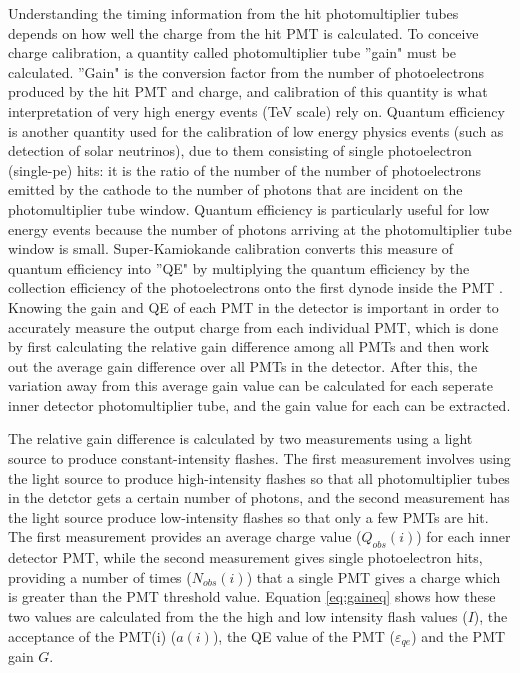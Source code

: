 Understanding the timing information from the hit photomultiplier tubes depends on how well the charge from the hit PMT is calculated. To conceive charge calibration, a quantity called photomultiplier tube ''gain" must be calculated. ''Gain" is the conversion factor from the number of photoelectrons produced by the hit PMT and charge, and calibration of this quantity is what interpretation of very high energy events (TeV scale) rely on. Quantum efficiency is another quantity used for the calibration of low energy physics events (such as detection of solar neutrinos), due to them consisting of single photoelectron (single-pe) hits: it is the ratio of the number of the number of photoelectrons emitted by the cathode to the number of photons that are incident on the photomultiplier tube window. Quantum efficiency is particularly useful for low energy events because the number of photons arriving at the photomultiplier tube window is small. Super-Kamiokande calibration converts this measure of quantum efficiency into ''QE" by multiplying the quantum efficiency by the collection efficiency of the photoelectrons onto the first dynode inside the PMT \cite{abe_calibration_2014}. Knowing the gain and QE of each PMT in the detector is important in order to accurately measure the output charge from each individual PMT, which is done by first calculating the relative gain difference among all PMTs and then work out the average gain difference over all PMTs in the detector. After this, the variation away from this average gain value can be calculated for each seperate inner detector photomultiplier tube, and the gain value for each can be extracted. 

The relative gain difference is calculated by two measurements using a light source to produce constant-intensity flashes. The first measurement involves using the light source to produce high-intensity flashes so that all photomultiplier tubes in the detctor gets a certain number of photons, and the second measurement has the light source produce low-intensity flashes so that only a few PMTs are hit. The first measurement provides an average charge value ($Q_{o b s}(i)$) for each inner detector PMT, while the second measurement gives single photoelectron hits, providing a number of times ($N_{o b s}(i)$) that a single PMT gives a charge which is greater than the PMT threshold value. Equation \ref{eq:gaineq} shows how these two values are calculated from the the high and low intensity flash values ($I$), the acceptance of the PMT(i) ($a(i)$), the QE value of the PMT ($\varepsilon_{q e}$) and the PMT gain $G$. 


